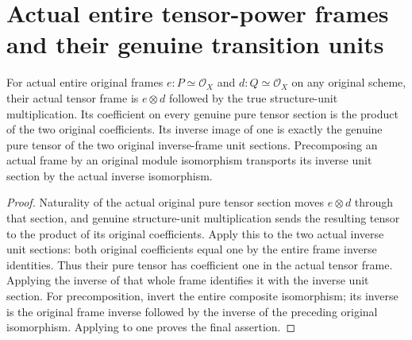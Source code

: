 \section{Actual entire tensor-power frames and their genuine transition units}

\begin{lemma}\label{lem:fc-actual-tensor-frame-unit-coefficient}
\leanok
{}
For actual entire original frames $e:P\simeq\mathcal O_X$ and
$d:Q\simeq\mathcal O_X$ on any original scheme, their actual
tensor frame is $e\otimes d$ followed by the true structure-unit
multiplication. Its coefficient on every genuine pure tensor
section is the product of the two original coefficients. Its
inverse image of one is exactly the genuine pure tensor of the
two original inverse-frame unit sections. Precomposing an actual
frame by an original module isomorphism transports its inverse
unit section by the actual inverse isomorphism.
\end{lemma}
\begin{proof}
Naturality of the actual original pure tensor section moves
$e\otimes d$ through that section, and genuine structure-unit
multiplication sends the resulting tensor to the product of
its original coefficients. Apply this to the two actual inverse
unit sections: both original coefficients equal one by the entire
frame inverse identities. Thus their pure tensor has coefficient
one in the actual tensor frame. Applying the inverse of that
whole frame identifies it with the inverse unit section. For
precomposition, invert the entire composite isomorphism; its
inverse is the original frame inverse followed by the inverse
of the preceding original isomorphism. Applying to one proves
the final assertion.
\end{proof}


